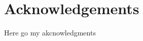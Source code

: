 



\bigskip


\begingroup

\let\clearpage\relax
\let\cleardoublepage\relax
\let\cleardoublepage\relax

\chapter*{Acknowledgements}
Here go my akcnowledgments



\endgroup
